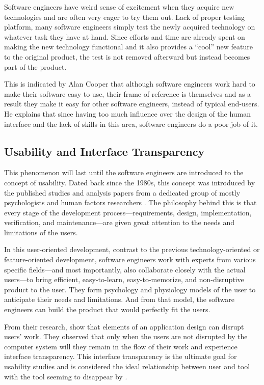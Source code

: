 \documentclass{acm_proc_article-sp}
\begin{document}
Software engineers have weird sense of excitement when they acquire
new technologies and are often very eager to try them out. Lack of
proper testing platform, many software engineers simply test the newly
acquired technology on whatever task they have at hand. Since efforts
and time are already spent on making the new technology functional and
it also provides a ``cool'' new feature to the original product, the
test is not removed afterward but instead becomes part of the product.

This is indicated by Alan Cooper \citeyearpar{inmates:cooper} that
although software engineers work hard to make their software easy to
use, their frame of reference is themselves and as a result they make
it easy for other software engineers, instead of typical end-users. He
explains that since having too much influence over the design of the
human interface and the lack of skills in this area, software
engineers do a poor job of it.

\subsection{Usability and Interface Transparency}
This phenomenon will last until the software engineers are introduced
to the concept of usability. Dated back since the 1980s, this concept
was introduced by the published studies and analysis papers from a
dedicated group of mostly psychologists and human factors researchers
\citep{human:rubinstein, friendly:simpson, human:shneiderman,
  human:brown, software:dumas}. The philosophy behind this is that
every stage of the development process---requirements, design,
implementation, verification, and maintenance---are given great
attention to the needs and limitations of the users.

In this user-oriented development, contrast to the previous
technology-oriented or feature-oriented development, software
engineers work with experts from various specific fields---and most
importantly, also collaborate closely with the actual users---to bring
efficient, easy-to-learn, easy-to-memorize, and non-disruptive product
to the user. They form psychology and physiology models of the user to
anticipate their needs and limitations. And from that model, the
software engineers can build the product that would perfectly fit the
users.

From their research, \citet{transparency:holtzblatt} show that
elements of an application design can disrupt users' work. They
observed that only when the users are not disrupted by the computer
system will they remain in the flow of their work and experience
interface transparency. This interface transparency is the ultimate
goal for usability studies and is considered the ideal relationship
between user and tool with the tool seeming to disappear by
\citet{transparency:rutkoski}.
\end{document}
